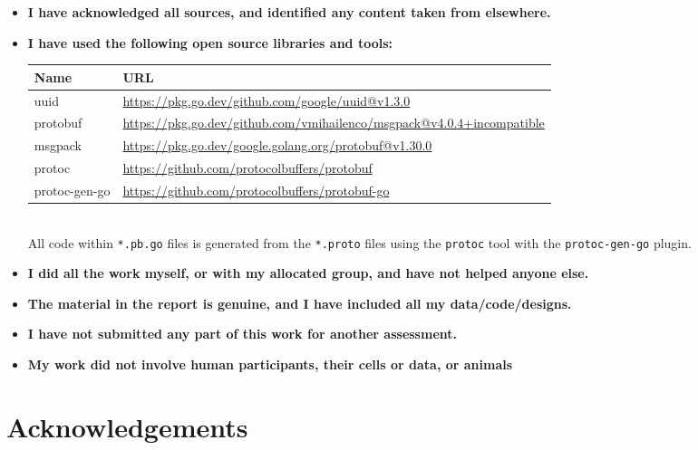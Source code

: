 \documentclass[12pt]{report}
\begin{document}
\begin{itemize}
    \item \textbf{I have acknowledged all sources, and identified any content taken from elsewhere.}
    \item \textbf{I have used the following open source libraries and tools:}\\[-0.8cm]
    \begin{table}[h]
        \centering
        \begin{tabularx}{\textwidth}{|l|X|}
        \hline
        \textbf{Name} & \textbf{URL} \\ \hline
        uuid     &  \scriptsize{\url{https://pkg.go.dev/github.com/google/uuid@v1.3.0}}  \\ 
        protobuf     &   \scriptsize{\url{https://pkg.go.dev/github.com/vmihailenco/msgpack@v4.0.4+incompatible}}  \\
        msgpack     &    \scriptsize{\url{https://pkg.go.dev/google.golang.org/protobuf@v1.30.0}} \\ 
        protoc    &    \scriptsize{\url{https://github.com/protocolbuffers/protobuf}} \\
        protoc-gen-go   &    \scriptsize{\url{https://github.com/protocolbuffers/protobuf-go}} \\ 
        \hline
        \end{tabularx}
    \end{table}
    \\[-.4cm]All code within \texttt{*.pb.go} files is generated from the \texttt{*.proto} files using the \texttt{protoc} tool with the \texttt{protoc-gen-go} plugin.
    \item \textbf{I did all the work myself, or with my allocated group, and have not helped anyone else.}
    \item \textbf{The material in the report is genuine, and I have included all my data/code/designs.}
    \item \textbf{I have not submitted any part of this work for another assessment.}
    \item \textbf{My work did not involve human participants, their cells or data, or animals}
\end{itemize}

\newpage
\chapter*{Acknowledgements}
\end{document}
